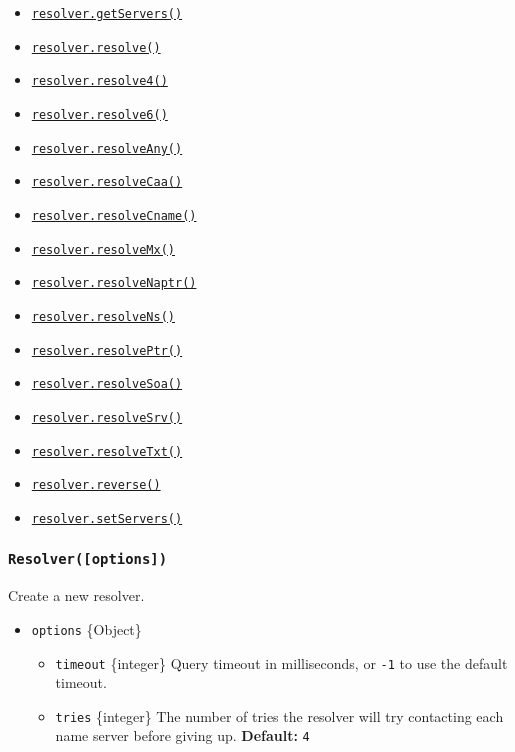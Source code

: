 \begin{itemize}
\tightlist
\item
  \hyperref[dnsgetservers]{\texttt{resolver.getServers()}}
\item
  \hyperref[dnsresolvehostname-rrtype-callback]{\texttt{resolver.resolve()}}
\item
  \hyperref[dnsresolve4hostname-options-callback]{\texttt{resolver.resolve4()}}
\item
  \hyperref[dnsresolve6hostname-options-callback]{\texttt{resolver.resolve6()}}
\item
  \hyperref[dnsresolveanyhostname-callback]{\texttt{resolver.resolveAny()}}
\item
  \hyperref[dnsresolvecaahostname-callback]{\texttt{resolver.resolveCaa()}}
\item
  \hyperref[dnsresolvecnamehostname-callback]{\texttt{resolver.resolveCname()}}
\item
  \hyperref[dnsresolvemxhostname-callback]{\texttt{resolver.resolveMx()}}
\item
  \hyperref[dnsresolvenaptrhostname-callback]{\texttt{resolver.resolveNaptr()}}
\item
  \hyperref[dnsresolvenshostname-callback]{\texttt{resolver.resolveNs()}}
\item
  \hyperref[dnsresolveptrhostname-callback]{\texttt{resolver.resolvePtr()}}
\item
  \hyperref[dnsresolvesoahostname-callback]{\texttt{resolver.resolveSoa()}}
\item
  \hyperref[dnsresolvesrvhostname-callback]{\texttt{resolver.resolveSrv()}}
\item
  \hyperref[dnsresolvetxthostname-callback]{\texttt{resolver.resolveTxt()}}
\item
  \hyperref[dnsreverseip-callback]{\texttt{resolver.reverse()}}
\item
  \hyperref[dnssetserversservers]{\texttt{resolver.setServers()}}
\end{itemize}

\subsubsection{\texorpdfstring{\texttt{Resolver({[}options{]})}}{Resolver({[}options{]})}}\label{resolveroptions}

Create a new resolver.

\begin{itemize}
\tightlist
\item
  \texttt{options} \{Object\}

  \begin{itemize}
  \tightlist
  \item
    \texttt{timeout} \{integer\} Query timeout in milliseconds, or
    \texttt{-1} to use the default timeout.
  \item
    \texttt{tries} \{integer\} The number of tries the resolver will try
    contacting each name server before giving up. \textbf{Default:}
    \texttt{4}
  \end{itemize}
\end{itemize}

